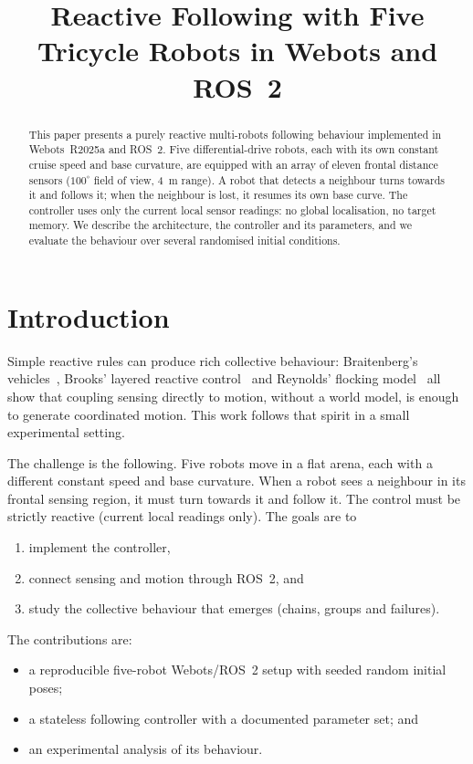 \documentclass[conference]{IEEEtran}
\title{Reactive Following with Five Tricycle Robots in Webots and ROS~2}
\author{
\IEEEauthorblockN{JOHANSEN Magnus, SANTOS Júlio, COLOMBU Jules, PINHEIRO Nathan}
\IEEEauthorblockA{
Faculty of Engineering of the University of Porto (FEUP)\\
Porto, Portugal\\
\{email1, email2, email3, email4\}@fe.up.pt %
}
}
\begin{document}
\maketitle

\begin{abstract}
\normalfont
This paper presents a purely reactive multi-robots following behaviour
implemented in Webots~R2025a and ROS~2. Five differential-drive robots,
each with its own constant cruise speed and base curvature, are equipped
with an array of eleven frontal distance sensors
($100^{\circ}$ field of view, \SI{4}{m} range). A robot that detects a
neighbour turns towards it and follows it; when the neighbour is lost,
it resumes its own base curve. The controller uses only the current local
sensor readings: no global localisation, no target memory. We describe
the architecture, the controller and its parameters, and we evaluate the
behaviour over several randomised initial conditions.
\end{abstract}

\section{Introduction}
Simple reactive rules can produce rich collective behaviour:
Braitenberg's vehicles~\cite{braitenberg1984vehicles}, Brooks' layered
reactive control~\cite{brooks1986robust} and Reynolds' flocking
model~\cite{reynolds1987flocks} all show that coupling sensing directly
to motion, without a world model, is enough to generate coordinated
motion. This work follows that spirit in a small experimental setting.

The challenge is the following. Five robots move in a flat arena, each
with a different constant speed and base curvature. When a robot sees a
neighbour in its frontal sensing region, it must turn towards it and
follow it. The control must be strictly reactive (current local readings
only). The goals are to
\begin{enumerate}
    \item implement the controller,
    \item connect sensing and motion through ROS~2, and
    \item study the collective behaviour that emerges (chains, groups
          and failures).
\end{enumerate}

The contributions are:
\begin{itemize}
    \item a reproducible five-robot Webots/ROS~2 setup with seeded
          random initial poses;
    \item a stateless following controller with a documented parameter
          set; and
    \item an experimental analysis of its behaviour.
\end{itemize}
\end{document}
